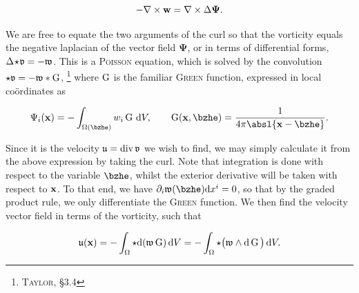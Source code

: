 \[
  -\nabla \times \mathbf{w} = \nabla \times \Delta \mathbf{\Psi}.
\]

\noindent
We are free to equate the two arguments of the curl so that the vorticity equals the negative laplacian of the vector field $\mathbf{\Psi}$, or in terms of differential forms, $\Delta \!\star\! \mathfrak{v} = -\mathfrak{w}$.
This is a \textsc{Poisson} equation, which is solved by the convolution $\star\mathfrak{v} = -\mathfrak{w} \ast \operatorname{G}$,%
\footnote{%
        \cite{taylor2023partial} \textsc{Taylor}, \S3.4
}
where $\operatorname{G}$ is the familiar \textsc{Green} function, expressed in local coördinates as

\[
        \Psi_i(\xvec) = -\int_{\Omega(\bzhe)} w_i \green \,\dee V, \qquad \green(\xvec, \bzhe) = \frac{1}{4\pi \absl{\xvec - \bzhe}}.
\]

\noindent
Since it is the velocity $\mathfrak{u} = \operatorname{div}\mathfrak{v}$ we wish to find, we may simply calculate it from the above expression by taking the curl.
Note that integration is done with respect to the variable $\bzhe$, whilst the exterior derivative will be taken with respect to $\mathbf{x}$.
To that end, we have $\partial_i \vorticityfrak(\bzhe)\dee x^{i} = 0$, so that by the graded product rule, we only differentiate the \textsc{Green} function.
We then find the velocity vector field in terms of the vorticity, such that

\begin{equation}\label{eq:Biot-Savart_volume}
        \mathfrak{u}(\mathbf{x}) = -\int_{\Omega} \star\mathrm{d}(\mathfrak{w} \operatorname{G}) \,\mathrm{d} V = -\int_{\Omega} \star\big( \mathfrak{w}\wedge\mathrm{d}\operatorname{G} \big) \,\mathrm{d} V.
\end{equation}

